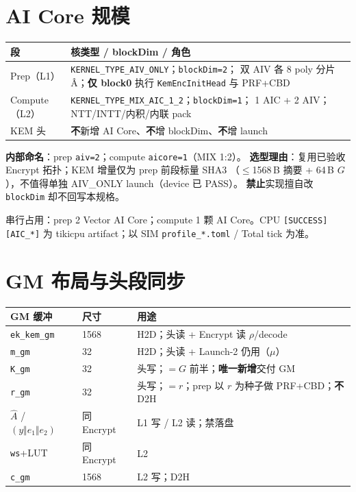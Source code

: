 \documentclass[UTF8,a4paper,11pt]{ctexart}
\begin{document}
\section{AI Core 规模}
\label{sec:aicore}

\begin{longtable}{@{}L{3.2cm}L{10cm}@{}}
\toprule
段 & 核类型 / blockDim / 角色 \\
\midrule
Prep（L1） & \texttt{KERNEL\_TYPE\_AIV\_ONLY}；\texttt{blockDim=2}；
             双 AIV 各 8 poly 分片 \^A；\textbf{仅 block0} 执行
             \texttt{KemEncInitHead} 与 PRF+CBD \\
Compute（L2） & \texttt{KERNEL\_TYPE\_MIX\_AIC\_1\_2}；\texttt{blockDim=1}；
                1 AIC + 2 AIV；NTT/INTT/内积/内联 pack \\
KEM 头 & \textbf{不}新增 AI Core、\textbf{不}增 blockDim、\textbf{不}增 launch \\
\bottomrule
\end{longtable}

\textbf{内部命名}：prep \texttt{aiv=2}；compute \texttt{aicore=1}（MIX 1:2）。
\textbf{选型理由}：复用已验收 Encrypt 拓扑；KEM 增量仅为 prep 前段标量 SHA3
（$\le$1568\,B 摘要 + 64\,B $G$），不值得单独 AIV\_ONLY launch（device 已 PASS）。
\textbf{禁止}实现擅自改 \texttt{blockDim} 却不回写本规格。

串行占用：prep 2 Vector AI Core；compute 1 颗 AI Core。CPU
\texttt{[SUCCESS][AIC\_*]} 为 tikicpu artifact；以 SIM \texttt{profile\_*.toml} /
Total tick 为准。

\section{GM 布局与头段同步}
\label{sec:gm}

\begin{longtable}{@{}L{3.4cm}L{2.0cm}L{7.4cm}@{}}
\toprule
GM 缓冲 & 尺寸 & 用途 \\
\midrule
\texttt{ek\_kem\_gm} & 1568 & H2D；头读 + Encrypt 读 $\rho$/decode \\
\texttt{m\_gm} & 32 & H2D；头读 + Launch-2 仍用（$\mu$） \\
\texttt{K\_gm} & 32 & 头写；$= G$ 前半；\textbf{唯一新增}交付 GM \\
\texttt{r\_gm} & 32 & 头写；$=r$；prep 以 $r$ 为种子做 PRF+CBD；\textbf{不}D2H \\
$\hat{A}$ / $(y\Vert e_1\Vert e_2)$ & 同 Encrypt & L1 写 / L2 读；禁落盘 \\
\texttt{ws}+LUT & 同 Encrypt & L2 \\
\texttt{c\_gm} & 1568 & L2 写；D2H \\
\bottomrule
\end{longtable}
\end{document}
